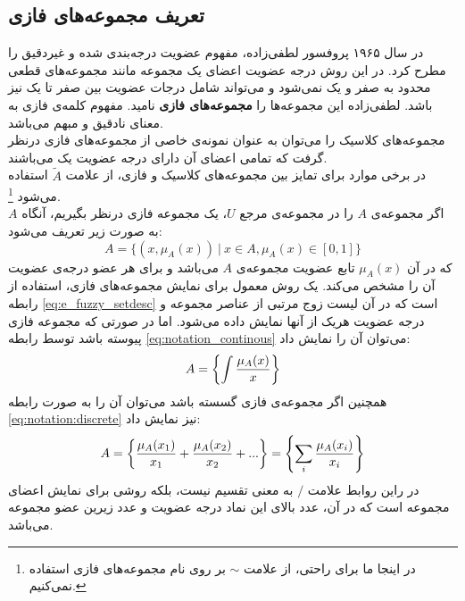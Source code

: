  \subsection{تعریف مجموعه‌های فازی}
در سال ۱۹۶۵ پروفسور لطفی‌زاده، مفهوم عضویت درجه‌بندی شده و غیردقیق را مطرح کرد. در این روش درجه عضویت اعضای یک مجموعه مانند مجموعه‌های قطعی محدود به صفر و یک نمی‌شود و می‌تواند شامل درجات عضویت بین صفر تا یک نیز باشد. لطفی‌زاده این مجموعه‌ها را 
\textbf{مجموعه‌های فازی}
 نامید. مفهوم کلمه‌ی فازی به معنای نادقیق و مبهم می‌باشد. \\
 مجموعه‌های کلاسیک را می‌توان به عنوان نمونه‌ی خاصی از مجموعه‌های فازی درنظر گرفت که تمامی اعضای آن دارای درجه عضویت یک می‌باشند.
 \cite{Bojadziev2007}
 \\
 در برخی موارد برای تمایز بین مجموعه‌های کلاسیک و فازی، از علامت $\widetilde{A}$ استفاده می‌شود
 \footnote{ در اینجا ما برای راحتی، از علامت $ \sim $ بر روی نام مجموعه‌های فازی استفاده نمی‌کنیم.}.
 \cite{Lee2005}
 \\
 اگر مجموعه‌ی $A$ را در مجموعه‌ی مرجع $U$، یک مجموعه فازی درنظر بگیریم، آنگاه $A$ به صورت زیر تعریف می‌شود:
\begin{equation}\label{eq:e_fuzzy_setdesc}
A= \{  (x, \mu_{A}(x))\ |\ x \in A, \mu_{A}(x) \in [0,1]  \}
\end{equation} 
که در آن $\mu_{A}(x)$ تابع عضویت مجموعه‌ی $A$ می‌باشد و برای هر عضو درجه‌ی عضویت آن را مشخص می‌کند. 
 یک روش معمول برای نمایش مجموعه‌های فازی، استفاده از رابطه 
\ref{eq:e_fuzzy_setdesc}
است که در آن لیست زوج مرتبی از عناصر مجموعه و درجه عضویت هریک از آنها نمایش داده می‌شود.
اما در صورتی که مجموعه فازی پیوسته باشد توسط رابطه 
\ref{eq:notation_continous}
می‌توان آن را نمایش داد:
\begin{equation}\label{eq:notation_continous}
A=\left\lbrace  \int {\mu_{A}(x) \over x} \right\rbrace
\end{equation}
همچنین اگر مجموعه‌ی فازی گسسته باشد می‌توان آن را به صورت رابطه 
\ref{eq:notation:discrete}
نیز نمایش داد:
\cite{Ross2004}
\begin{equation}\label{eq:notation:discrete}
	A=\left\lbrace {\mu_{A}(x_1) \over x_1}+{\mu_{A}(x_2) \over x_2}+... \right\rbrace = \left\lbrace \sum_{i} {\mu_{A}(x_i) \over x_i}\right\rbrace 
\end{equation}
در راین روابط علامت $/$ به معنی تقسیم نیست، بلکه روشی برای نمایش اعضای مجموعه است که در آن، عدد بالای این نماد درجه عضویت و عدد زیرین عضو مجموعه می‌باشد.
 \cite{Bojadziev2007}
 \\

